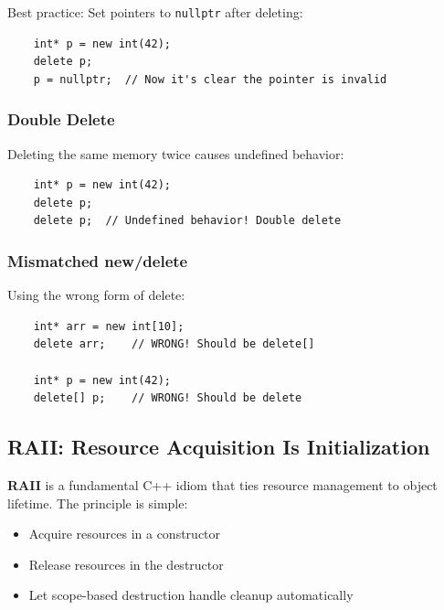 Best practice: Set pointers to \texttt{nullptr} after deleting:

\begin{lstlisting}
	int* p = new int(42);
	delete p;
	p = nullptr;  // Now it's clear the pointer is invalid
\end{lstlisting}

\subsubsection{Double Delete}

Deleting the same memory twice causes undefined behavior:

\begin{lstlisting}
	int* p = new int(42);
	delete p;
	delete p;  // Undefined behavior! Double delete
\end{lstlisting}

\subsubsection{Mismatched new/delete}

Using the wrong form of delete:

\begin{lstlisting}
	int* arr = new int[10];
	delete arr;    // WRONG! Should be delete[]
	
	int* p = new int(42);
	delete[] p;    // WRONG! Should be delete
\end{lstlisting}

\subsection{RAII: Resource Acquisition Is Initialization}

\textbf{RAII} is a fundamental C++ idiom that ties resource management to object lifetime. The principle is simple:

\begin{itemize}
	\item Acquire resources in a constructor
	\item Release resources in the destructor
	\item Let scope-based destruction handle cleanup automatically
\end{itemize}

